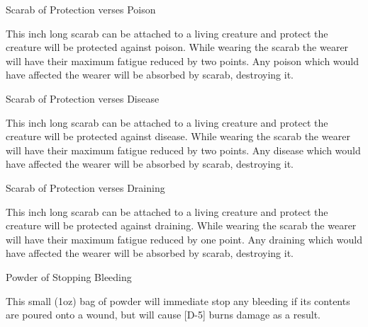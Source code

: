 \documentclass[a4paper]{article}
\begin{document}


\begin{ep-box}{Scarab of Protection verses Poison}

This inch long scarab can be attached to a living creature and protect
the creature will be protected against poison.  While wearing the
scarab the wearer will have their maximum fatigue reduced by two
points.  Any poison which would have affected the wearer will be
absorbed by scarab, destroying it.
\end{ep-box}


\begin{ep-box}{Scarab of Protection verses Disease}

This inch long scarab can be attached to a living creature and protect
the creature will be protected against disease.  While wearing the
scarab the wearer will have their maximum fatigue reduced by two
points.  Any disease which would have affected the wearer will be
absorbed by scarab, destroying it.
\end{ep-box}

\begin{ep-box}{Scarab of Protection verses Draining}

This inch long scarab can be attached to a living creature and protect
the creature will be protected against draining.  While wearing the
scarab the wearer will have their maximum fatigue reduced by one
point.  Any draining which would have affected the wearer will be
absorbed by scarab, destroying it.
\end{ep-box}

\begin{ep-box}{Powder of Stopping Bleeding}

This small (1oz) bag of powder will immediate stop any bleeding if its
contents are poured onto a wound, but will cause [D-5] burns damage as
a result.
\end{ep-box}
\end{document}
